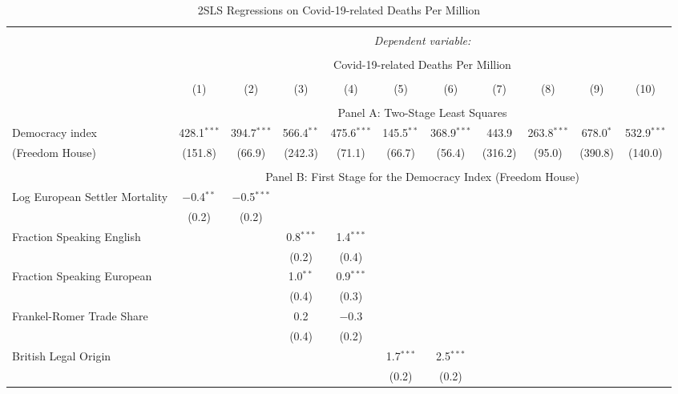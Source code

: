 
\begin{table}[!htbp] \centering
  \caption{2SLS Regressions on Covid-19-related Deaths Per Million}
  \label{tab:2sls-deaths-restrict-sample} 
  \footnotesize
  \begin{threeparttable}
\begin{tabular}{@{\extracolsep{0pt}}lcccccccccc} 
\\[-1.8ex]\hline 
\hline \\[-1.8ex] 
 & \multicolumn{10}{c}{\textit{Dependent variable:}} \\ 
\cline{2-11} 
\\[-1.8ex] & \multicolumn{10}{c}{Covid-19-related Deaths Per Million} \\ 
\\[-1.8ex] & (1) & (2) & (3) & (4) & (5) & (6) & (7) & (8) & (9) & (10)\\ 
\hline \\[-1.8ex] 
  & \multicolumn{10}{c}{Panel A: Two-Stage Least Squares} \\
Democracy index & 428.1$^{***}$ & 394.7$^{***}$ & 566.4$^{**}$ & 475.6$^{***}$ & 145.5$^{**}$ & 368.9$^{***}$ & 443.9 & 263.8$^{***}$ & 678.0$^{*}$ & 532.9$^{***}$ \\ 
(Freedom House)  & (151.8) & (66.9) & (242.3) & (71.1) & (66.7) & (56.4) & (316.2) & (95.0) & (390.8) & (140.0) \\ 
\hline \\[-1.8ex] 
   & \multicolumn{10}{c}{Panel B: First Stage for the Democracy Index (Freedom House)} \\
  Log European Settler Mortality & $-$0.4$^{**}$ & $-$0.5$^{***}$ &  &  &  &  &  &  &  &  \\ 
  & (0.2) & (0.2) &  &  &  &  &  &  &  &  \\ 
  Fraction Speaking English &  &  & 0.8$^{***}$ & 1.4$^{***}$ &  &  &  &  &  &  \\ 
  &  &  & (0.2) & (0.4) &  &  &  &  &  &  \\ 
  Fraction Speaking European &  &  & 1.0$^{**}$ & 0.9$^{***}$ &  &  &  &  &  &  \\ 
  &  &  & (0.4) & (0.3) &  &  &  &  &  &  \\ 
  Frankel-Romer Trade Share &  &  & 0.2 & $-$0.3 &  &  &  &  &  &  \\ 
  &  &  & (0.4) & (0.2) &  &  &  &  &  &  \\ 
  British Legal Origin &  &  &  &  & 1.7$^{***}$ & 2.5$^{***}$ &  &  &  &  \\ 
  &  &  &  &  & (0.2) & (0.2) &  &  &  &  \\ 

\end{tabular}
\end{threeparttable}
\end{table}
